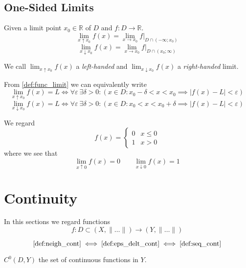 \subsection{One-Sided Limits}
\begin{definition}\label{def:one-sided_limit}
   Given a limit point \(x_0 \in \mathbb{R}\) of \(D\) and \(f: D \to \mathbb{R}\).
   \[\lim_{x \uparrow x_0}f(x) = \lim_{x \to x_0} f|_{D \cap (-\infty; x_0)}\]
   \[\lim_{x \downarrow x_0}f(x) = \lim_{x \to x_0} f|_{D \cap (x_0; \infty)}\]
\end{definition}
\begin{remark}[Terminology]
   We call \(\lim_{x \uparrow x_0} f(x)\) a \emph{left-handed} and \(\lim_{x \downarrow x_0} f(x)\) a \emph{right-handed} limit.
\end{remark}
\begin{remark}
   From \cref{def:func_limit} we can equivalently write
   \[\lim_{x \uparrow x_0} f(x) = L \iff \forall \varepsilon~\exists \delta > 0: (x \in D: x_0- \delta < x < x_0 \implies |f(x) - L| < \varepsilon)\]
   \[\lim_{x \downarrow x_0} f(x) = L \iff \forall \varepsilon~\exists \delta > 0: (x \in D: x_0 < x < x_0 + \delta \implies |f(x) - L| < \varepsilon)\]
\end{remark}
\begin{example}
   We regard
   \[f(x) = \begin{cases}0 & x \leq 0\\ 1 & x > 0\end{cases}\]
   where we see that
   \[\lim_{x \uparrow 0} f(x) = 0 \qquad \lim_{x \downarrow 0} f(x) = 1\]
\end{example}
\begin{center}
   
\end{center}

\newpage

\section{Continuity}
In this sections we regard functions
\[f: D \subset (X, \|\ldots\|) \to (Y, \|\ldots\|)\]

\begin{theorem}
   \[\text{\cref{def:neigh_cont}} \iff \text{\cref{def:eps_delt_cont}} \iff \text{\cref{def:seq_cont}}\]
\end{theorem}

\begin{definition}
   \(C^0(D, Y)\) the set of continuous functions in \(Y\).
\end{definition}

